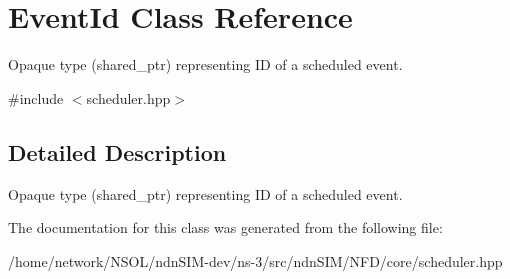 \hypertarget{classEventId}{}\section{Event\+Id Class Reference}
\label{classEventId}


Opaque type (shared\+\_\+ptr) representing ID of a scheduled event.  




{\ttfamily \#include $<$scheduler.\+hpp$>$}



\subsection{Detailed Description}
Opaque type (shared\+\_\+ptr) representing ID of a scheduled event. 

The documentation for this class was generated from the following file\+:\begin{DoxyCompactItemize}
\item 
/home/network/\+N\+S\+O\+L/ndn\+S\+I\+M-\/dev/ns-\/3/src/ndn\+S\+I\+M/\+N\+F\+D/core/scheduler.\+hpp\end{DoxyCompactItemize}

